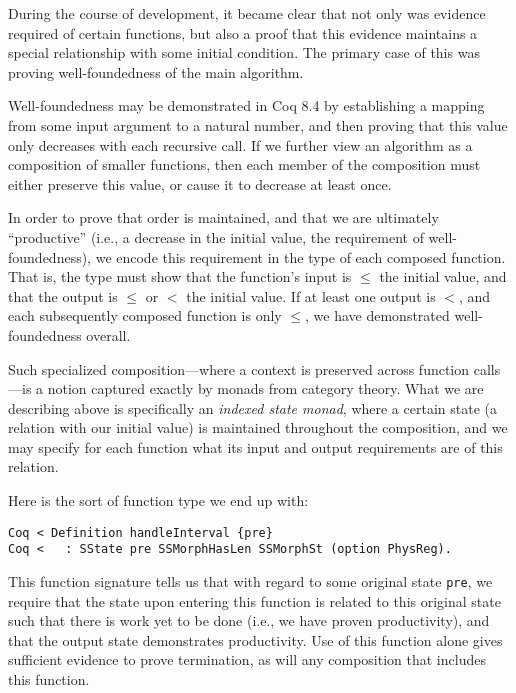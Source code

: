 \documentclass{llncs}
\begin{document}
During the course of development, it became clear that not only was evidence
required of certain functions, but also a proof that this evidence maintains a
special relationship with some initial condition.  The primary case of this
was proving well-foundedness of the main algorithm.

Well-foundedness may be demonstrated in Coq 8.4 by establishing a mapping from
some input argument to a natural number, and then proving that this value only
decreases with each recursive call.  If we further view an algorithm as a
composition of smaller functions, then each member of the composition must
either preserve this value, or cause it to decrease at least once.

In order to prove that order is maintained, and that we are ultimately
``productive'' (i.e., a decrease in the initial value, the requirement of
well-foundedness), we encode this requirement in the type of each composed
function.  That is, the type must show that the function's input is $\le$ the
initial value, and that the output is $\le$ or $<$ the initial value.  If at
least one output is $<$, and each subsequently composed function is only
$\le$, we have demonstrated well-foundedness overall.

Such specialized composition---where a context is preserved across function
calls---is a notion captured exactly by monads from category theory.  What we
are describing above is specifically an \emph{indexed state monad}, where a
certain state (a relation with our initial value) is maintained throughout the
composition, and we may specify for each function what its input and output
requirements are of this relation.

Here is the sort of function type we end up with:

\begin{flushleft}
\texttt{Coq~{<}~Definition~handleInterval~\{pre\}}\\
\texttt{Coq~{<}~~~:~SState~pre~SSMorphHasLen~SSMorphSt~(option~PhysReg).}\\
\end{flushleft}

This function signature tells us that with regard to some original state
\texttt{pre}, we require that the state upon entering this function is related
to this original state such that there is work yet to be done (i.e., we have
proven productivity), and that the output state demonstrates productivity.
Use of this function alone gives sufficient evidence to prove termination, as
will any composition that includes this function.
\end{document}
